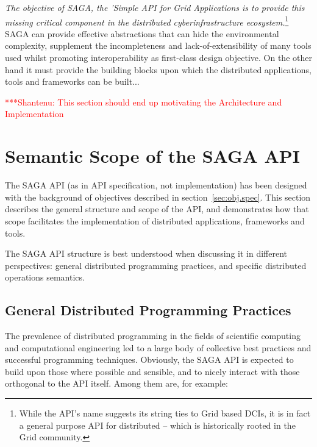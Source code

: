\documentclass[a4paper,12pt]{article}
\newcommand{\jhanote}[1]{  {\textcolor{red}  { ***Shantenu: #1 }}}
\newcommand{\jhanote}[1]{}
\begin{document}
 {\it The objective of SAGA, the 'Simple API for Grid Applications is
   to provide this missing critical component in the distributed
   cyberinfrastructure ecosystem.}\footnote{While the API's name
   suggests its string ties to Grid based DCIs, it is in fact a
   general purpose API for distributed -- which is historically rooted
   in the Grid community.}  SAGA can provide effective abstractions
 that can hide the environmental complexity, supplement the
 incompleteness and lack-of-extensibility of many tools used whilst
 promoting interoperability as first-class design objective.  On the
 other hand it must provide the building blocks upon which the
 distributed applications, tools and frameworks can be built...


\jhanote{This section should end up motivating the Architecture and
 Implementation}


% 
\section{Semantic Scope of the SAGA API}
\label{sec:api}

 The SAGA API (as in API specification, not implementation) has been
 designed with the background of objectives described in
 section~\ref{sec:obj.spec}.  This section describes the
 general structure and scope of the API, and demonstrates how that
 scope facilitates the implementation of distributed applications,
 frameworks and tools.

 The SAGA API structure is best understood when discussing it in
 different perspectives: general distributed programming practices,
 and specific distributed operations semantics.

 \subsection{General Distributed Programming Practices}
 \label{ssec:bestpractices}
 
  The prevalence of distributed programming in the fields of
  scientific computing and computational engineering led to a large
  body of collective best practices and successful programming
  techniques.  Obviously, the SAGA API is expected to build upon those
  where possible and sensible, and to nicely interact with those
  orthogonal to the API itself.  Among them are, for example:
\end{document}
